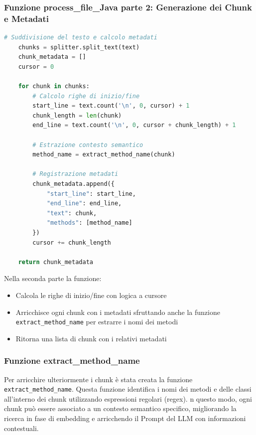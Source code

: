 \documentclass[12pt,a4paper,openright,twoside]{book}
\begin{document}
\subsubsection{Funzione process\_file\_Java parte 2: Generazione dei Chunk e Metadati}
\begin{lstlisting}[language=Python, caption={Generazione chunk e metadati}]
    # Suddivisione del testo e calcolo metadati
    chunks = splitter.split_text(text)
    chunk_metadata = []
    cursor = 0
    
    for chunk in chunks:
        # Calcolo righe di inizio/fine
        start_line = text.count('\n', 0, cursor) + 1
        chunk_length = len(chunk)
        end_line = text.count('\n', 0, cursor + chunk_length) + 1
        
        # Estrazione contesto semantico
        method_name = extract_method_name(chunk)
        
        # Registrazione metadati
        chunk_metadata.append({
            "start_line": start_line,
            "end_line": end_line,
            "text": chunk,
            "methods": [method_name]
        })
        cursor += chunk_length
    
    return chunk_metadata
\end{lstlisting}

Nella seconda parte la funzione:
\begin{itemize}
    \item Calcola le righe di inizio/fine con logica a cursore
    \item Arricchisce ogni chunk con i metadati sfruttando anche la funzione \texttt{extract\_method\_name} per estrarre i nomi dei metodi
    \item Ritorna una lista di chunk con i relativi metadati
\end{itemize}


\subsubsection{Funzione extract\_method\_name}
Per arricchire ulteriormente i chunk è stata creata la funzione \texttt{extract\_method\_name}.
Questa funzione identifica i nomi dei metodi e delle classi all'interno dei chunk utilizzando espressioni regolari (regex).
 n questo modo, ogni chunk può essere associato a un contesto semantico specifico, migliorando la ricerca in fase di embedding e arricchendo il Prompt del LLM con informazioni contestuali.
\end{document}
